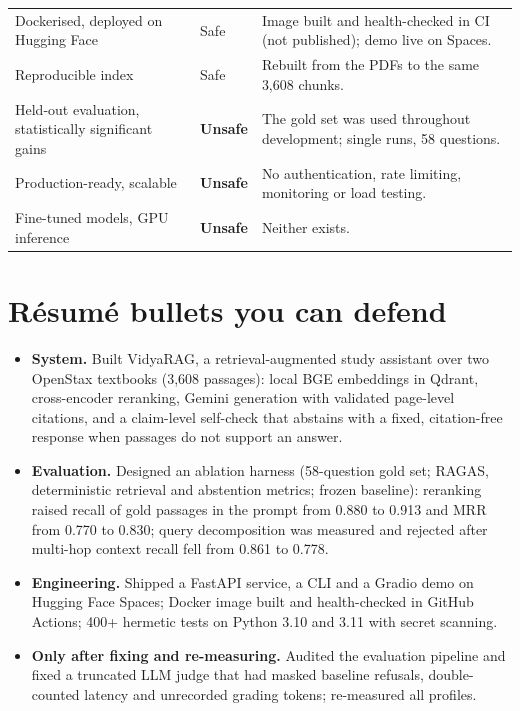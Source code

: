 \begin{longtable}{@{}>{\raggedright\arraybackslash}p{5.0cm}>{\raggedright\arraybackslash}p{2.0cm}>{\raggedright\arraybackslash}p{8.8cm}@{}}
Dockerised, deployed on Hugging Face & Safe & Image built and health-checked in CI (not published); demo live on Spaces.\\
Reproducible index & Safe & Rebuilt from the PDFs to the same 3,608 chunks.\\
Held-out evaluation, statistically significant gains & \textbf{Unsafe} & The gold set was used throughout development; single runs, 58 questions.\\
Production-ready, scalable & \textbf{Unsafe} & No authentication, rate limiting, monitoring or load testing.\\
Fine-tuned models, GPU inference & \textbf{Unsafe} & Neither exists.\\
\bottomrule
\end{longtable}

\section{Résumé bullets you can defend}

\begin{recommended}[wording]
\begin{itemize}
  \item \textbf{System.} Built VidyaRAG, a retrieval-augmented study assistant over two OpenStax textbooks (3,608 passages): local BGE embeddings in Qdrant, cross-encoder reranking, Gemini generation with validated page-level citations, and a claim-level self-check that abstains with a fixed, citation-free response when passages do not support an answer.
  \item \textbf{Evaluation.} Designed an ablation harness (58-question gold set; RAGAS, deterministic retrieval and abstention metrics; frozen baseline): reranking raised recall of gold passages in the prompt from 0.880 to 0.913 and MRR from 0.770 to 0.830; query decomposition was measured and rejected after multi-hop context recall fell from 0.861 to 0.778.
  \item \textbf{Engineering.} Shipped a FastAPI service, a CLI and a Gradio demo on Hugging Face Spaces; Docker image built and health-checked in GitHub Actions; 400+ hermetic tests on Python 3.10 and 3.11 with secret scanning.
  \item \textbf{Only after fixing and re-measuring.} Audited the evaluation pipeline and fixed a truncated LLM judge that had masked baseline refusals, double-counted latency and unrecorded grading tokens; re-measured all profiles.
\end{itemize}
\end{recommended}

